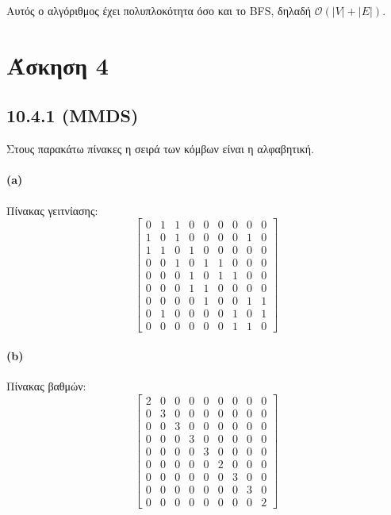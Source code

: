 \documentclass[a4paper,11pt]{article}
\begin{document}
Αυτός ο αλγόριθμος έχει πολυπλοκότητα όσο και το BFS, δηλαδή $\mathcal{O}(|V|+|E|)$.


\section*{Άσκηση 4}

\subsection*{10.4.1 (MMDS)}

Στους παρακάτω πίνακες η σειρά των κόμβων είναι η αλφαβητική.

\paragraph{(a)} Πίνακας γειτνίασης:
\[
	\begin{bmatrix}
		0 & 1 & 1 & 0 & 0 & 0 & 0 & 0 & 0 \\
		1 & 0 & 1 & 0 & 0 & 0 & 0 & 1 & 0 \\
		1 & 1 & 0 & 1 & 0 & 0 & 0 & 0 & 0 \\
		0 & 0 & 1 & 0 & 1 & 1 & 0 & 0 & 0 \\
		0 & 0 & 0 & 1 & 0 & 1 & 1 & 0 & 0 \\
		0 & 0 & 0 & 1 & 1 & 0 & 0 & 0 & 0 \\
		0 & 0 & 0 & 0 & 1 & 0 & 0 & 1 & 1 \\
		0 & 1 & 0 & 0 & 0 & 0 & 1 & 0 & 1 \\
		0 & 0 & 0 & 0 & 0 & 0 & 1 & 1 & 0
	\end{bmatrix}
\]

\paragraph{(b)} Πίνακας βαθμών:
\[
	\begin{bmatrix}
		2 & 0 & 0 & 0 & 0 & 0 & 0 & 0 & 0 \\
		0 & 3 & 0 & 0 & 0 & 0 & 0 & 0 & 0 \\
		0 & 0 & 3 & 0 & 0 & 0 & 0 & 0 & 0 \\
		0 & 0 & 0 & 3 & 0 & 0 & 0 & 0 & 0 \\
		0 & 0 & 0 & 0 & 3 & 0 & 0 & 0 & 0 \\
		0 & 0 & 0 & 0 & 0 & 2 & 0 & 0 & 0 \\
		0 & 0 & 0 & 0 & 0 & 0 & 3 & 0 & 0 \\
		0 & 0 & 0 & 0 & 0 & 0 & 0 & 3 & 0 \\
		0 & 0 & 0 & 0 & 0 & 0 & 0 & 0 & 2
	\end{bmatrix}
\]
\end{document}
